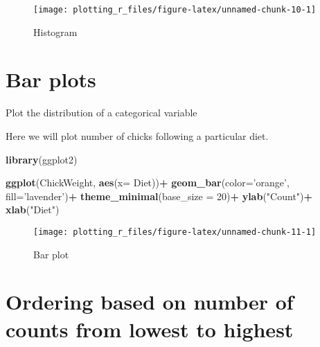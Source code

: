 \documentclass[
]{book}
\newenvironment{Shaded}{\begin{snugshade}}{\end{snugshade}}
\newcommand{\DataTypeTok}[1]{\textcolor[rgb]{0.13,0.29,0.53}{#1}}
\newcommand{\DecValTok}[1]{\textcolor[rgb]{0.00,0.00,0.81}{#1}}
\newcommand{\KeywordTok}[1]{\textcolor[rgb]{0.13,0.29,0.53}{\textbf{#1}}}
\newcommand{\NormalTok}[1]{#1}
\newcommand{\OperatorTok}[1]{\textcolor[rgb]{0.81,0.36,0.00}{\textbf{#1}}}
\newcommand{\StringTok}[1]{\textcolor[rgb]{0.31,0.60,0.02}{#1}}
\begin{document}
\begin{figure}

{\centering \texttt{[image: plotting\_r\_files/figure-latex/unnamed-chunk-10-1]} 

}

\caption{Histogram}\label{fig:unnamed-chunk-10}
\end{figure}

\hypertarget{bar-plots}{%
\section{Bar plots}\label{bar-plots}}

Plot the distribution of a categorical variable

Here we will plot number of chicks following a particular diet.

\begin{Shaded}
\begin{Highlighting}[]
\KeywordTok{library}\NormalTok{(ggplot2)}

\KeywordTok{ggplot}\NormalTok{(ChickWeight, }\KeywordTok{aes}\NormalTok{(}\DataTypeTok{x=}\NormalTok{ Diet))}\OperatorTok{+}
\StringTok{  }\KeywordTok{geom_bar}\NormalTok{(}\DataTypeTok{color=}\StringTok{'orange'}\NormalTok{, }\DataTypeTok{fill=}\StringTok{'lavender'}\NormalTok{)}\OperatorTok{+}
\StringTok{  }\KeywordTok{theme_minimal}\NormalTok{(}\DataTypeTok{base_size =} \DecValTok{20}\NormalTok{)}\OperatorTok{+}
\StringTok{  }\KeywordTok{ylab}\NormalTok{(}\StringTok{"Count"}\NormalTok{)}\OperatorTok{+}\StringTok{ }\KeywordTok{xlab}\NormalTok{(}\StringTok{"Diet"}\NormalTok{)}
\end{Highlighting}
\end{Shaded}

\begin{figure}

{\centering \texttt{[image: plotting\_r\_files/figure-latex/unnamed-chunk-11-1]} 

}

\caption{Bar plot}\label{fig:unnamed-chunk-11}
\end{figure}

\hypertarget{ordering-based-on-number-of-counts-from-lowest-to-highest}{%
\section{Ordering based on number of counts from lowest to highest}\label{ordering-based-on-number-of-counts-from-lowest-to-highest}}
\end{document}

